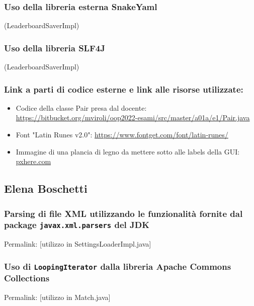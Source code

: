 \documentclass[a4paper,12pt]{report}
\begin{document}
\subsubsection{Uso della libreria esterna SnakeYaml}
(LeaderboardSaverImpl)

\subsubsection{Uso della libreria SLF4J}
(LeaderboardSaverImpl)

\subsubsection{Link a parti di codice esterne e link alle risorse utilizzate:}

\begin{itemize}
	
	\item Codice della classe Pair presa dal docente: \url{https://bitbucket.org/mviroli/oop2022-esami/src/master/a01a/e1/Pair.java}
	\item Font "Latin Runes v2.0": \url{ https://www.fontget.com/font/latin-runes/}
	\item Immagine di una plancia di legno da mettere sotto alle labels della GUI: \href{https://get.pxhere.com/photo/background-tree-wood-boards-texture-wooden-background-old-brown-wood-texture-gray-wood-old-tree-old-fence-the-texture-of-the-wood-rustik-rustic-rural-wood-background-old-boards-fence-1370487.jpg}{pxhere.com}
	
\end{itemize}

\subsection{Elena Boschetti}

\subsubsection{Parsing di file XML utilizzando le funzionalità fornite dal package \texttt{javax.xml.parsers} del JDK}
Permalink: [utilizzo in SettingsLoaderImpl.java]

\subsubsection{Uso di \texttt{LoopingIterator} dalla libreria Apache Commons Collections}
Permalink: [utilizzo in Match.java]
\end{document}
